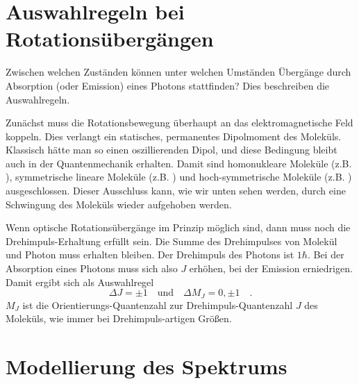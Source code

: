 \section{Auswahlregeln bei Rotationsübergängen}

Zwischen welchen Zuständen können unter welchen Umständen Übergänge durch Absorption (oder Emission) eines Photons stattfinden? Dies beschreiben  die Auswahlregeln.

Zunächst muss die Rotationsbewegung überhaupt an das elektromagnetische Feld koppeln. Dies verlangt  ein statisches, permanentes Dipolmoment des Moleküls. Klassisch hätte man so einen oszillierenden Dipol, und diese Bedingung bleibt auch in der Quantenmechanik erhalten. Damit sind homonukleare Moleküle (z.B. ), symmetrische lineare Moleküle (z.B. ) und hoch-symmetrische Moleküle (z.B. ) ausgeschlossen. Dieser Ausschluss kann, wie wir unten sehen werden, durch eine Schwingung des Moleküls wieder aufgehoben werden.

Wenn optische Rotationsübergänge im Prinzip möglich sind, dann muss noch die Drehimpuls-Erhaltung erfüllt sein. Die Summe des Drehimpulses von Molekül und Photon muss erhalten bleiben. Der Drehimpuls des Photons ist $1 \hbar$. Bei der Absorption eines Photons muss sich also $J$ erhöhen, bei der Emission erniedrigen. Damit ergibt sich als Auswahlregel
\begin{equation}
\Delta J = \pm 1 \quad \text{und} \quad \Delta M_J = 0, \pm 1 \quad .
\end{equation}
$M_J$ ist die Orientierungs-Quantenzahl zur Drehimpuls-Quantenzahl $J$ des Moleküls, wie immer bei Drehimpuls-artigen Größen.

\section{Modellierung des Spektrums}

\begin{marginfigure}
\caption{Skizze Zustände und Übergange.}
\end{marginfigure}


